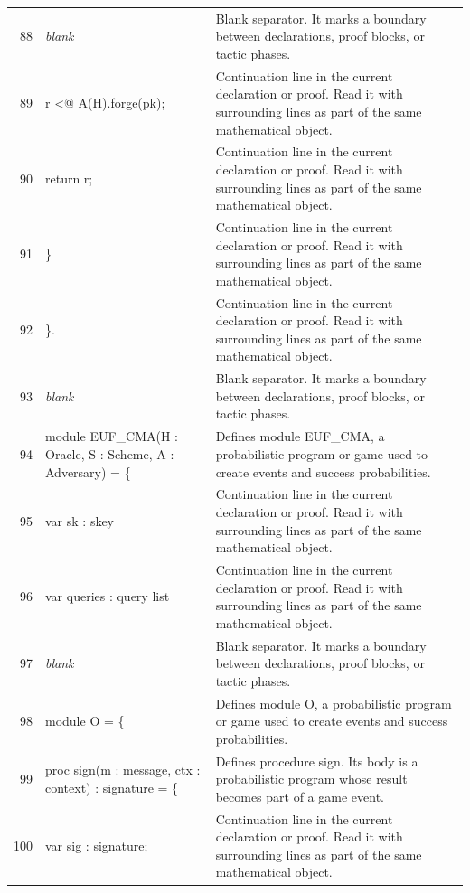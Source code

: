 \documentclass[10pt]{article}
\begin{document}
\begin{longtable}{r L{0.53\textwidth} L{0.37\textwidth}}
88 & {\ttfamily\scriptsize \emph{blank}} & Blank separator.  It marks a boundary between declarations, proof blocks, or tactic phases. \\
89 & {\ttfamily\scriptsize     r <@ A(H).forge(pk);} & Continuation line in the current declaration or proof.  Read it with surrounding lines as part of the same mathematical object. \\
90 & {\ttfamily\scriptsize     return r;} & Continuation line in the current declaration or proof.  Read it with surrounding lines as part of the same mathematical object. \\
91 & {\ttfamily\scriptsize   \}} & Continuation line in the current declaration or proof.  Read it with surrounding lines as part of the same mathematical object. \\
92 & {\ttfamily\scriptsize \}.} & Continuation line in the current declaration or proof.  Read it with surrounding lines as part of the same mathematical object. \\
93 & {\ttfamily\scriptsize \emph{blank}} & Blank separator.  It marks a boundary between declarations, proof blocks, or tactic phases. \\
94 & {\ttfamily\scriptsize module EUF\_CMA(H : Oracle, S : Scheme, A : Adversary) = \{} & Defines module EUF\_CMA, a probabilistic program or game used to create events and success probabilities. \\
95 & {\ttfamily\scriptsize   var sk : skey} & Continuation line in the current declaration or proof.  Read it with surrounding lines as part of the same mathematical object. \\
96 & {\ttfamily\scriptsize   var queries : query list} & Continuation line in the current declaration or proof.  Read it with surrounding lines as part of the same mathematical object. \\
97 & {\ttfamily\scriptsize \emph{blank}} & Blank separator.  It marks a boundary between declarations, proof blocks, or tactic phases. \\
98 & {\ttfamily\scriptsize   module O = \{} & Defines module O, a probabilistic program or game used to create events and success probabilities. \\
99 & {\ttfamily\scriptsize     proc sign(m : message, ctx : context) : signature = \{} & Defines procedure sign.  Its body is a probabilistic program whose result becomes part of a game event. \\
100 & {\ttfamily\scriptsize       var sig : signature;} & Continuation line in the current declaration or proof.  Read it with surrounding lines as part of the same mathematical object. \\

\end{longtable}
\end{document}
